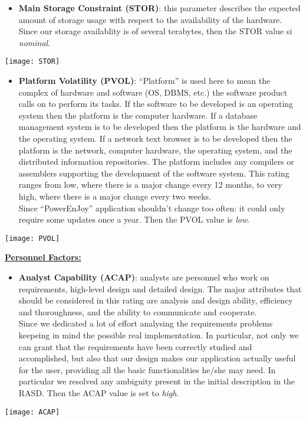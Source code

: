 \begin{itemize}
	\item \textbf{Main Storage Constraint (STOR)}: this parameter describes the expected amount of storage usage with respect to the availability of the hardware. Since our storage availablity is of several terabytes, then the STOR value si \textit{nominal}.
\end{itemize}
\begin{center}
	\texttt{[image: STOR]}
\end{center}

\begin{itemize}
	\item \textbf{Platform Volatility (PVOL)}: ``Platform'' is used here to mean the complex of hardware and software (OS, DBMS, etc.) the software product calls on to perform its tasks. If the software to be developed is an operating system then the platform is the computer hardware. If a database management system is to be	developed then the platform is the hardware and the operating system. If a network text browser is to be developed then the platform is the network, computer hardware, the operating system, and the distributed information repositories. The platform includes any compilers or assemblers	supporting the development of the software system. This rating ranges from low, where there is	a major change every 12 months, to very high, where there is a major change every two weeks. \\ Since ``PowerEnJoy'' application shouldn't change too often: it could only require some updates once a year. Then the PVOL value is \textit{low}.
\end{itemize}
\begin{center}
	\texttt{[image: PVOL]}
\end{center}
\textbf{\underline{Personnel Factors:}}

\begin{itemize}
	\item \textbf{Analyst Capability (ACAP)}: analysts are personnel who work on requirements, high-level design and detailed design.	The major attributes that should be considered in this rating are analysis and design ability,	efficiency and thoroughness, and the ability to communicate and cooperate. \\ Since we dedicated a lot of effort analysing the requirements problems keepeing in mind the possible real implementation. In particular, not only we can grant that the requirements have been correctly studied and accomplished, but also that our
	design makes our application actually useful for the user, providing all the basic functionalities he/she may need. In particular we resolved any ambiguity present in the initial description in the RASD. Then the ACAP value is set to \textit{high}.
\end{itemize}
\begin{center}
	\texttt{[image: ACAP]}
\end{center}	

